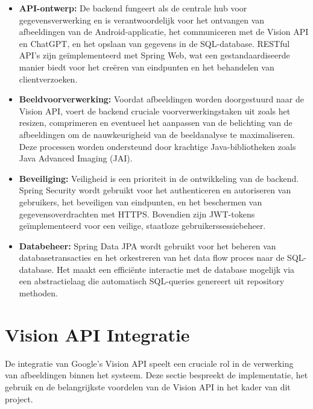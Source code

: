 \begin{itemize}
    \item \textbf{API-ontwerp:} De backend fungeert als de centrale hub voor gegevensverwerking en is verantwoordelijk voor het ontvangen van afbeeldingen van de Android-applicatie, het communiceren met de Vision API en ChatGPT, en het opslaan van gegevens in de SQL-database. RESTful API's zijn geïmplementeerd met Spring Web, wat een gestandaardiseerde manier biedt voor het creëren van eindpunten en het behandelen van clientverzoeken.
    
    \item \textbf{Beeldvoorverwerking:} Voordat afbeeldingen worden doorgestuurd naar de Vision API, voert de backend cruciale voorverwerkingstaken uit zoals het resizen, comprimeren en eventueel het aanpassen van de belichting van de afbeeldingen om de nauwkeurigheid van de beeldanalyse te maximaliseren. Deze processen worden ondersteund door krachtige Java-bibliotheken zoals Java Advanced Imaging (JAI).
    
    \item \textbf{Beveiliging:} Veiligheid is een prioriteit in de ontwikkeling van de backend. Spring Security wordt gebruikt voor het authenticeren en autoriseren van gebruikers, het beveiligen van eindpunten, en het beschermen van gegevensoverdrachten met HTTPS. Bovendien zijn JWT-tokens geïmplementeerd voor een veilige, staatloze gebruikerssessiebeheer.
    
    \item \textbf{Databeheer:} Spring Data JPA wordt gebruikt voor het beheren van databasetransacties en het orkestreren van het data flow proces naar de SQL-database. Het maakt een efficiënte interactie met de database mogelijk via een abstractielaag die automatisch SQL-queries genereert uit repository methoden.
    
\end{itemize}

\pagebreak

\section{Vision API Integratie}
De integratie van Google's Vision API speelt een cruciale rol in de verwerking van afbeeldingen binnen het systeem. Deze sectie bespreekt de implementatie, het gebruik en de belangrijkste voordelen van de Vision API in het kader van dit project.

